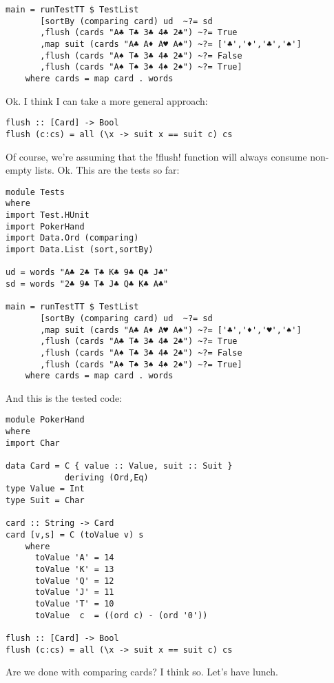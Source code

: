 \begin{lstlisting}[frame=single]
main = runTestTT $ TestList 
       [sortBy (comparing card) ud  ~?= sd
       ,flush (cards "A♣ T♣ 3♣ 4♣ 2♣") ~?= True
       ,map suit (cards "A♣ A♦ A♥ A♠") ~?= ['♣','♦','♣','♠']
       ,flush (cards "A♠ T♣ 3♣ 4♣ 2♣") ~?= False
       ,flush (cards "A♠ T♠ 3♠ 4♠ 2♠") ~?= True]
    where cards = map card . words
\end{lstlisting} %
\hspace*{\fill}
\lhA \failure Ok. I think I can take a more general approach:
\begin{lstlisting}[frame=single]
flush :: [Card] -> Bool
flush (c:cs) = all (\x -> suit x == suit c) cs
\end{lstlisting}
\success Of course, we're assuming that the \il!flush! function will always consume non-empty lists. 
\lhN Ok. This are the tests so far:
\begin{lstlisting}[frame=single]
module Tests
where 
import Test.HUnit
import PokerHand
import Data.Ord (comparing)
import Data.List (sort,sortBy)

ud = words "A♣ 2♣ T♣ K♣ 9♣ Q♣ J♣"
sd = words "2♣ 9♣ T♣ J♣ Q♣ K♣ A♣"

main = runTestTT $ TestList 
       [sortBy (comparing card) ud  ~?= sd
       ,map suit (cards "A♣ A♦ A♥ A♠") ~?= ['♣','♦','♥','♠']
       ,flush (cards "A♣ T♣ 3♣ 4♣ 2♣") ~?= True
       ,flush (cards "A♠ T♣ 3♣ 4♣ 2♣") ~?= False
       ,flush (cards "A♠ T♠ 3♠ 4♠ 2♠") ~?= True]
    where cards = map card . words
\end{lstlisting} %
\hspace*{\fill}
\lhA And this is the tested code:
\begin{lstlisting}[frame=single]
module PokerHand
where
import Char

data Card = C { value :: Value, suit :: Suit } 
            deriving (Ord,Eq)
type Value = Int
type Suit = Char

card :: String -> Card
card [v,s] = C (toValue v) s
    where 
      toValue 'A' = 14
      toValue 'K' = 13
      toValue 'Q' = 12
      toValue 'J' = 11
      toValue 'T' = 10
      toValue  c  = ((ord c) - (ord '0'))

flush :: [Card] -> Bool
flush (c:cs) = all (\x -> suit x == suit c) cs
\end{lstlisting}
\lhN Are we done with comparing cards?
\lhA I think so. Let's have lunch.
\lhend
